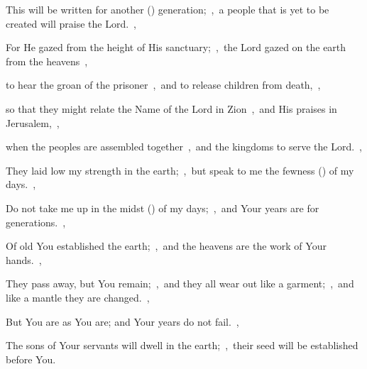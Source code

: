 \documentclass[12pt,twoside,a5paper]{article}
\begin{document}
\begin{normalparskip}
  This will be written for another () generation;~\sep\ a people that is yet to be created will praise the Lord.~\sep

  For He gazed from the height of His sanctuary;~\sep\ the Lord gazed on the earth from the heavens~\sep

  to hear the groan of the prisoner~\sep\ and to release children from death,~\sep

  so that they might relate the Name of the Lord in Zion~\sep\ and His praises in Jerusalem,~\sep

  when the peoples are assembled together~\sep\ and the kingdoms to serve the Lord.~\sep

  They laid low my strength in the earth;~\sep\ but speak to me the fewness () of my days.~\sep

  Do not take me up in the midst () of my days;~\sep\ and Your years are for generations.~\sep

  Of old You established the earth;~\sep\ and the heavens are the work of Your hands.~\sep

  They pass away, but You remain;~\sep\ and they all wear out like a garment;~\sep\ and like a mantle they are changed.~\sep

  But You are as You are; and Your years do not fail.~\sep

  The sons of Your servants will dwell in the earth;~\sep\ their seed will be established before You.
\end{normalparskip}

\end{document}
